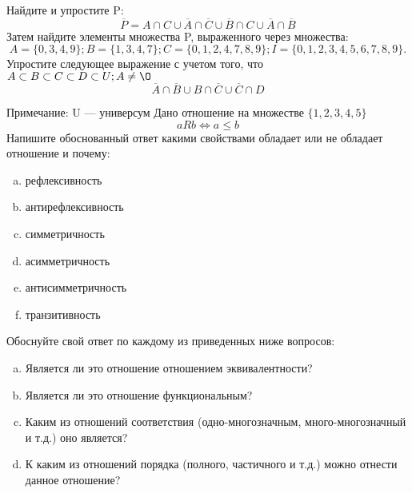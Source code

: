 \documentclass[10pt]{exam}
\begin{document}
\begin{questions}
\question
Найдите и упростите P:
\begin{equation*}
\overline{P} = A \cap C \cup \overline{A} \cap \overline{C} \cup \overline{B} \cap C \cup \overline{A} \cap \overline{B}
\end{equation*}
Затем найдите элементы множества P, выраженного через множества:
\begin{equation*}
A = \{0, 3, 4, 9\}; 
B = \{1, 3, 4, 7\};
C = \{0, 1, 2, 4, 7, 8, 9\};
I = \{0, 1, 2, 3, 4, 5, 6, 7, 8, 9\}.
\end{equation*}\question
Упростите следующее выражение с учетом того, что $A\subset B \subset C \subset D \subset U; A \neq \O$
\begin{equation*}
\overline{A} \cap \overline{B} \cup B \cap \overline{C} \cup \overline{C} \cap D
\end{equation*}

Примечание: U — универсум\question
Дано отношение на множестве $\{1, 2, 3, 4, 5\}$ 
\begin{equation*}
aRb \iff a \leq b
\end{equation*}
Напишите обоснованный ответ какими свойствами обладает или не обладает отношение и почему:   
\begin{enumerate} [a)]\setcounter{enumi}{0}
\item рефлексивность
\item антирефлексивность
\item симметричность
\item асимметричность
\item антисимметричность
\item транзитивность
\end{enumerate}

Обоснуйте свой ответ по каждому из приведенных ниже вопросов:
\begin{enumerate} [a)]\setcounter{enumi}{0}
    \item Является ли это отношение отношением эквивалентности?
    \item Является ли это отношение функциональным?
    \item Каким из отношений соответствия (одно-многозначным, много-многозначный и т.д.) оно является?
    \item К каким из отношений порядка (полного, частичного и т.д.) можно отнести данное отношение?
\end{enumerate}



\end{questions}
\end{document}
